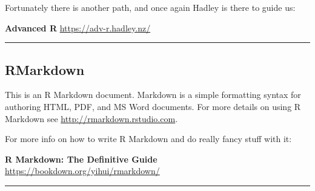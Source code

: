 \documentclass[
]{article}
\begin{document}
Fortunately there is another path, and once again Hadley is there to
guide us:

\textbf{Advanced R} \url{https://adv-r.hadley.nz/}

\begin{center}\rule{0.5\linewidth}{0.5pt}\end{center}

\hypertarget{rmarkdown}{%
\subsection{RMarkdown}\label{rmarkdown}}

This is an R Markdown document. Markdown is a simple formatting syntax
for authoring HTML, PDF, and MS Word documents. For more details on
using R Markdown see \url{http://rmarkdown.rstudio.com}.

For more info on how to write R Markdown and do really fancy stuff with
it:

\textbf{R Markdown: The Definitive Guide}
\url{https://bookdown.org/yihui/rmarkdown/}

\begin{center}\rule{0.5\linewidth}{0.5pt}\end{center}
\end{document}
